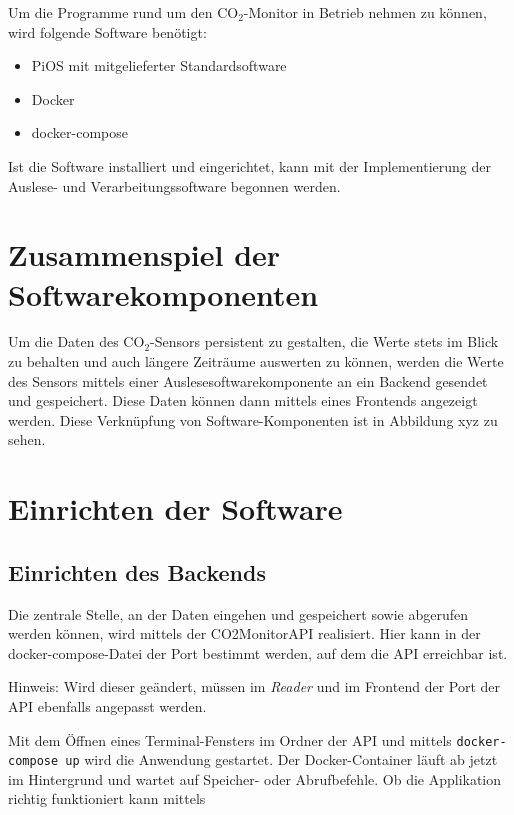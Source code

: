 \documentclass[a4paper,
    11pt,
    headings=small,
    ngerman,
    listof=totoc,
    numbers=noenddot]{scrreprt}[2021/11/13]
\begin{document}
Um die Programme rund um den CO$_2$-Monitor in Betrieb nehmen zu können, wird folgende Software benötigt:

\begin{itemize}
  \item PiOS mit mitgelieferter Standardsoftware
  \item Docker
  \item docker-compose
\end{itemize}

Ist die Software installiert und eingerichtet, kann mit der Implementierung der Auslese- und Verarbeitungssoftware begonnen werden.


\section{Zusammenspiel der Softwarekomponenten}


Um die Daten des CO$_2$-Sensors persistent zu gestalten, die Werte stets im Blick zu behalten und auch längere Zeiträume auswerten zu können, werden die Werte des Sensors mittels einer Auslesesoftwarekomponente an ein Backend gesendet und gespeichert. Diese Daten können dann mittels eines Frontends angezeigt werden. Diese Verknüpfung von Software-Komponenten ist in Abbildung xyz %
zu sehen.


\section{Einrichten der Software}

\subsection{Einrichten des Backends}

Die zentrale Stelle, an der Daten eingehen und gespeichert sowie abgerufen werden können, wird mittels der CO2MonitorAPI realisiert. Hier kann in der docker-compose-Datei der Port bestimmt werden, auf dem die \ac{API} erreichbar ist.

Hinweis: Wird dieser geändert, müssen im \textit{Reader} und im Frontend der Port der \ac{API} ebenfalls angepasst werden.

Mit dem Öffnen eines Terminal-Fensters im Ordner der \ac{API} und mittels \texttt{docker-compose up} wird die Anwendung gestartet. Der Docker-Container läuft ab jetzt im Hintergrund und wartet auf Speicher- oder Abrufbefehle. Ob die Applikation richtig funktioniert kann mittels
\end{document}
